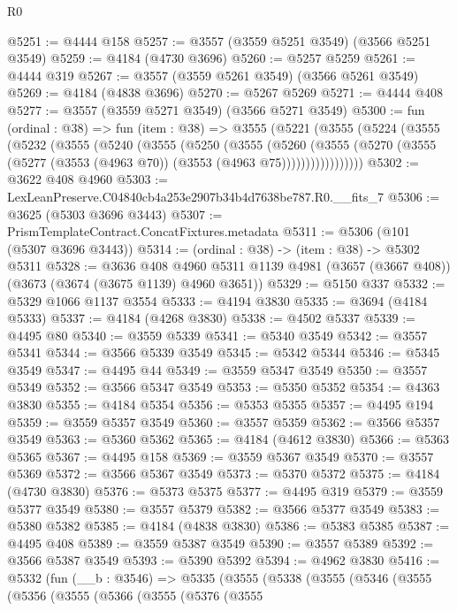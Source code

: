 \begin{lexlean}{R0}
\begin{coremodule}
@5251 := @4444 @158
@5257 := @3557 (@3559 @5251 @3549) (@3566 @5251 @3549)
@5259 := @4184 (@4730 @3696)
@5260 := @5257 @5259
@5261 := @4444 @319
@5267 := @3557 (@3559 @5261 @3549) (@3566 @5261 @3549)
@5269 := @4184 (@4838 @3696)
@5270 := @5267 @5269
@5271 := @4444 @408
@5277 := @3557 (@3559 @5271 @3549) (@3566 @5271 @3549)
@5300 := fun (ordinal : @38) =>
  fun (item : @38) =>
  @3555
    (@5221
      (@3555
        (@5224
          (@3555
            (@5232
              (@3555
                (@5240
                  (@3555
                    (@5250
                      (@3555
                        (@5260
                          (@3555
                            (@5270
                              (@3555 (@5277 (@3553 (@4963 @70)) (@3553 (@4963 @75)))))))))))))))))
@5302 := @3622 @408 @4960
@5303 := LexLeanPreserve.C04840cb4a253e2907b34b4d7638be787.R0.__fits_7
@5306 := @3625 (@5303 @3696 @3443)
@5307 := PrismTemplateContract.ConcatFixtures.metadata
@5311 := @5306 (@101 (@5307 @3696 @3443))
@5314 := (ordinal : @38) -> (item : @38) -> @5302 @5311
@5328 := @3636
    @408
    @4960
    @5311
    @1139
    @4981
    (@3657 (@3667 @408))
    (@3673 (@3674 (@3675 @1139) @4960 @3651))
@5329 := @5150 @337
@5332 := @5329 @1066 @1137 @3554
@5333 := @4194 @3830
@5335 := @3694 (@4184 @5333)
@5337 := @4184 (@4268 @3830)
@5338 := @4502 @5337
@5339 := @4495 @80
@5340 := @3559 @5339
@5341 := @5340 @3549
@5342 := @3557 @5341
@5344 := @3566 @5339 @3549
@5345 := @5342 @5344
@5346 := @5345 @3549
@5347 := @4495 @44
@5349 := @3559 @5347 @3549
@5350 := @3557 @5349
@5352 := @3566 @5347 @3549
@5353 := @5350 @5352
@5354 := @4363 @3830
@5355 := @4184 @5354
@5356 := @5353 @5355
@5357 := @4495 @194
@5359 := @3559 @5357 @3549
@5360 := @3557 @5359
@5362 := @3566 @5357 @3549
@5363 := @5360 @5362
@5365 := @4184 (@4612 @3830)
@5366 := @5363 @5365
@5367 := @4495 @158
@5369 := @3559 @5367 @3549
@5370 := @3557 @5369
@5372 := @3566 @5367 @3549
@5373 := @5370 @5372
@5375 := @4184 (@4730 @3830)
@5376 := @5373 @5375
@5377 := @4495 @319
@5379 := @3559 @5377 @3549
@5380 := @3557 @5379
@5382 := @3566 @5377 @3549
@5383 := @5380 @5382
@5385 := @4184 (@4838 @3830)
@5386 := @5383 @5385
@5387 := @4495 @408
@5389 := @3559 @5387 @3549
@5390 := @3557 @5389
@5392 := @3566 @5387 @3549
@5393 := @5390 @5392
@5394 := @4962 @3830
@5416 := @5332
    (fun (__b : @3546) =>
    @5335
      (@3555
        (@5338
          (@3555
            (@5346
              (@3555
                (@5356
                  (@3555
                    (@5366
                      (@3555
                        (@5376
                          (@3555

\end{coremodule}
\end{lexlean}
